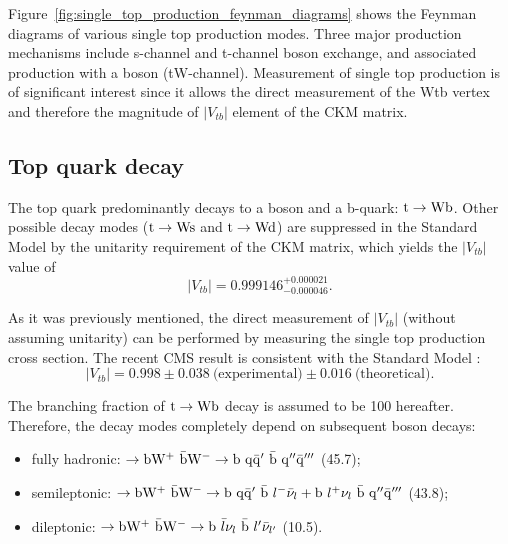 

Figure~\ref{fig:single_top_production_feynman_diagrams} shows the Feynman diagrams of various single top production
modes. Three major production mechanisms include s-channel and t-channel \W boson exchange, and associated production
with a \W boson (tW-channel). Measurement of single top production is of significant interest since it allows the direct
measurement of the Wtb vertex and therefore the magnitude of $|V_{tb}|$ element of the CKM matrix.



\subsection{Top quark decay}
\label{ss:top_decay}
The top quark predominantly decays to a \W boson and a b-quark: $\mathrm{t} \rightarrow \mathrm{W} \mathrm{b}$. Other possible decay modes
($\mathrm{t} \rightarrow \mathrm{W} \mathrm{s}$ and $\mathrm{t} \rightarrow \mathrm{W} \mathrm{d}$) are suppressed in the Standard Model by the unitarity
requirement of the CKM matrix, which yields \autocite{PDG} the $|V_{tb}|$ value of
\begin{equation}
|V_{tb}| = 0.999146^{+0.000021}_{-0.000046}.
\end{equation}

As it was previously mentioned, the direct measurement of $|V_{tb}|$ (without assuming unitarity) can be performed by
measuring the single top production cross section. The recent CMS result is consistent with the Standard
Model \autocite{single_top_Vtb_CMS}:
\begin{equation}
|V_{tb}| = 0.998 \pm 0.038~\textrm{(experimental)} \pm 0.016~\textrm{(theoretical)}.
\end{equation}

The branching fraction of $\mathrm{t} \rightarrow \mathrm{W} \mathrm{b}$ decay is assumed to be \SI{100}{\pc} hereafter. Therefore, the
\ttbar decay modes completely depend on subsequent \W boson decays:
\begin{itemize}
  \item fully hadronic: \ttbar $\rightarrow \mathrm{b} \mathrm{W}^+ ~ \bar{\mathrm{b}} \mathrm{W}^- \rightarrow  \mathrm{b}~\mathrm{q}\bar{\mathrm{q}}' ~
  \bar{\mathrm{b}}~\mathrm{q}'' \bar{\mathrm{q}}'''$ (\SI{45.7}{\pc});
  \item semileptonic: \ttbar $\rightarrow \mathrm{b} \mathrm{W}^+ ~ \bar{\mathrm{b}} \mathrm{W}^- \rightarrow \mathrm{b}~\mathrm{q}\bar{\mathrm{q}}' ~ \bar{\mathrm{b}}
  ~ l^- \bar{\nu}_l + \mathrm{b}~l^+ \nu_l ~ \bar{\mathrm{b}}~\mathrm{q}'' \bar{\mathrm{q}}'''$ (\SI{43.8}{\pc});
  \item dileptonic: \ttbar $\rightarrow \mathrm{b} \mathrm{W}^+ ~ \bar{\mathrm{b}} \mathrm{W}^- \rightarrow  \mathrm{b}~\bar{l} \nu_l ~ \bar{\mathrm{b}} ~
  l'\bar{\nu}_{l'}$ (\SI{10.5}{\pc}).
\end{itemize}

